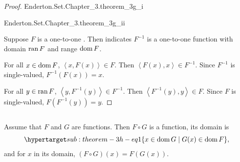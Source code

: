 \documentclass{report}
\newcommand{\pair}[1]{\left< #1 \right>}
\begin{document}
\begin{proof}

  \statementpadding

    {Enderton.Set.Chapter\_3.theorem\_3g\_i}

    {Enderton.Set.Chapter\_3.theorem\_3g\_ii}

  Suppose $F$ is a one-to-one .
  Then  indicates $F^{-1}$ is a one-to-one function with
    domain $\mathop{\text{ran}}{F}$ and range $\mathop{\text{dom}}{F}$.

  For all $x \in \mathop{\text{dom}}{F}$, $\pair{x, F(x)} \in F$.
  Then $\pair{F(x), x} \in F^{-1}$.
  Since $F^{-1}$ is single-valued, $F^{-1}(F(x)) = x$.

  For all $y \in \mathop{\text{ran}}{F}$, $\pair{y, F^{-1}(y)} \in F^{-1}$.
  Then $\pair{F^{-1}(y), y} \in F$.
  Since $F$ is single-valued, $F(F^{-1}(y)) = y$.

\end{proof}

\subsection{}%

\begin{theorem}[3H]

  Assume that $F$ and $G$ are functions.
  Then $F \circ G$ is a function, its domain is
    \begin{equation}
      \hyperlabel{sub:theorem-3h-eq1}
      \{x \in \dom{G} \mid G(x) \in \dom{F}\},
    \end{equation}
    and for $x$ in its domain, $(F \circ G)(x) = F(G(x))$.

\end{theorem}
\end{document}
